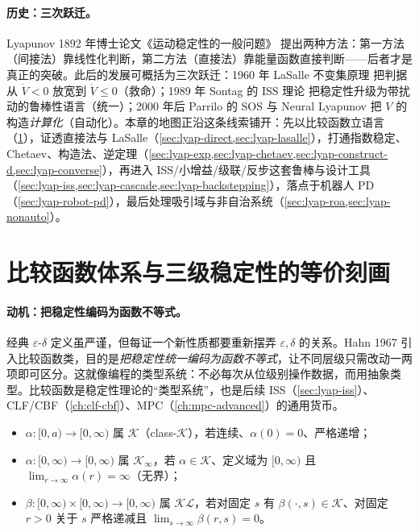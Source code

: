 \paragraph{历史：三次跃迁。}
Lyapunov 1892 年博士论文《运动稳定性的一般问题》\cite{lyapunov1992general} 提出两种方法：第一方法（间接法）靠线性化判断，第二方法（直接法）靠能量函数直接判断——后者才是真正的突破。此后的发展可概括为三次跃迁：1960 年 LaSalle 不变集原理\cite{lasalle1960extensions} 把判据从 $\dot V<0$ 放宽到 $\dot V\le0$（救命）；1989 年 Sontag 的 ISS 理论\cite{sontag1989smooth} 把稳定性升级为带扰动的鲁棒性语言（统一）；2000 年后 Parrilo 的 SOS\cite{parrilo2000structured} 与 Neural Lyapunov\cite{chang2019neural} 把 $V$ 的构造\emph{计算化}（自动化）。本章的地图正沿这条线索铺开：先以比较函数立语言（\cref{sec:lyap-comparison}），证透直接法与 LaSalle（\cref{sec:lyap-direct,sec:lyap-lasalle}），打通指数稳定、Chetaev、构造法、逆定理（\cref{sec:lyap-exp,sec:lyap-chetaev,sec:lyap-construct-d,sec:lyap-converse}），再进入 ISS/小增益/级联/反步这套鲁棒与设计工具（\cref{sec:lyap-iss,sec:lyap-cascade,sec:lyap-backstepping}），落点于机器人 PD（\cref{sec:lyap-robot-pd}），最后处理吸引域与非自治系统（\cref{sec:lyap-roa,sec:lyap-nonauto}）。

\section{比较函数体系与三级稳定性的等价刻画}
\label{sec:lyap-comparison}

\paragraph{动机：把稳定性编码为函数不等式。}
经典 $\varepsilon$-$\delta$ 定义虽严谨，但每证一个新性质都要重新摆弄 $\varepsilon,\delta$ 的关系。Hahn 1967\cite{hahn1967stability} 引入比较函数类，目的是\emph{把稳定性统一编码为函数不等式}，让不同层级只需改动一两项即可区分。这就像编程的类型系统：不必每次从位级别操作数据，而用抽象类型。比较函数是稳定性理论的“类型系统”，也是后续 ISS（\cref{sec:lyap-iss}）、CLF/CBF（\cref{ch:clf-cbf}）、MPC（\cref{ch:mpc-advanced}）的通用货币。

\begin{definition}
\label{def:lyap-class-k}
\begin{itemize}
  \item $\alpha:[0,a)\to[0,\infty)$ 属 $\mathcal{K}$（class-$\mathcal{K}$），若连续、$\alpha(0)=0$、严格递增；
  \item $\alpha:[0,\infty)\to[0,\infty)$ 属 $\mathcal{K}_\infty$，若 $\alpha\in\mathcal{K}$、定义域为 $[0,\infty)$ 且 $\lim_{r\to\infty}\alpha(r)=\infty$（无界）；
  \item $\beta:[0,\infty)\times[0,\infty)\to[0,\infty)$ 属 $\mathcal{KL}$，若对固定 $s$ 有 $\beta(\cdot,s)\in\mathcal{K}$、对固定 $r>0$ 关于 $s$ 严格递减且 $\lim_{s\to\infty}\beta(r,s)=0$。
\end{itemize}
\end{definition}

